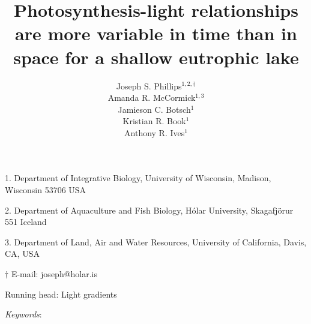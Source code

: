 \documentclass[12pt]{article}
\title{Photosynthesis-light relationships are more variable in time than in space 
        for a shallow eutrophic lake}
\author{
Joseph S. Phillips$^{1,2,\dagger}$ \\
Amanda R. McCormick$^{1,3}$ \\
Jamieson C. Botsch$^{1}$ \\
Kristian R. Book$^{1}$ \\
Anthony R. Ives$^{1}$}
\date{}
\begin{document}
\raggedright
\setlength\parindent{0.25in}

\maketitle

\noindent{} 1. Department of Integrative Biology, University of Wisconsin, Madison, Wisconsin 53706 USA

\noindent{} 2. Department of Aquaculture and Fish Biology, H\'{o}lar University, Skagafj\"{o}r{\dh}ur 551 Iceland

\noindent{} 3. Department of Land, Air and Water Resources, 
University of California, Davis, CA, USA

\noindent{} $\dagger$ E-mail: joseph@holar.is

\bigskip

Running head: {Light gradients}

\linenumbers{}

\clearpage








\bigskip

\textit{Keywords}: {}

\clearpage











\end{document}
